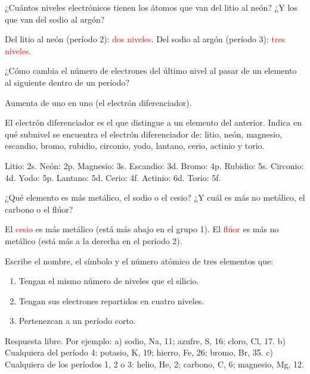 \begin{exercise}
    ¿Cuántos niveles electrónicos tienen los átomos que van del litio al neón? ¿Y los que van del sodio al argón?
    \begin{solu}
        Del litio al neón (período 2): \textcolor{red}{dos niveles}. Del sodio al argón (período 3): \textcolor{red}{tres niveles}.
    \end{solu}
\end{exercise}

\begin{exercise}
    ¿Cómo cambia el número de electrones del último nivel al pasar de un elemento al siguiente dentro de un período?
    \begin{solu}
        Aumenta de uno en uno (el electrón diferenciador).
    \end{solu}
\end{exercise}

\begin{exercise}
    El electrón diferenciador es el que distingue a un elemento del anterior. Indica en qué subnivel se encuentra el electrón diferenciador de: litio, neón, magnesio, escandio, bromo, rubidio, circonio, yodo, lantano, cerio, actinio y torio.
    \begin{solu}
        Litio: 2s. Neón: 2p. Magnesio: 3s. Escandio: 3d. Bromo: 4p. Rubidio: 5s. Circonio: 4d. Yodo: 5p. Lantano: 5d. Cerio: 4f. Actinio: 6d. Torio: 5f.
    \end{solu}
\end{exercise}

\begin{exercise}
    ¿Qué elemento es más metálico, el sodio o el cesio? ¿Y cuál es más no metálico, el carbono o el flúor?
    \begin{solu}
        El \textcolor{red}{cesio} es más metálico (está más abajo en el grupo 1). El \textcolor{red}{flúor} es más no metálico (está más a la derecha en el período 2).
    \end{solu}
\end{exercise}

\begin{exercise}
    Escribe el nombre, el símbolo y el número atómico de tres elementos que:
    \begin{enumerate}[label=\alph*)]
        \item Tengan el mismo número de niveles que el silicio.
        \item Tengan sus electrones repartidos en cuatro niveles.
        \item Pertenezcan a un período corto.
    \end{enumerate}
    \begin{solu}
        Respuesta libre. Por ejemplo: a) sodio, Na, 11; azufre, S, 16; cloro, Cl, 17. b) Cualquiera del período 4: potasio, K, 19; hierro, Fe, 26; bromo, Br, 35. c) Cualquiera de los períodos 1, 2 o 3: helio, He, 2; carbono, C, 6; magnesio, Mg, 12.
    \end{solu}
\end{exercise}

